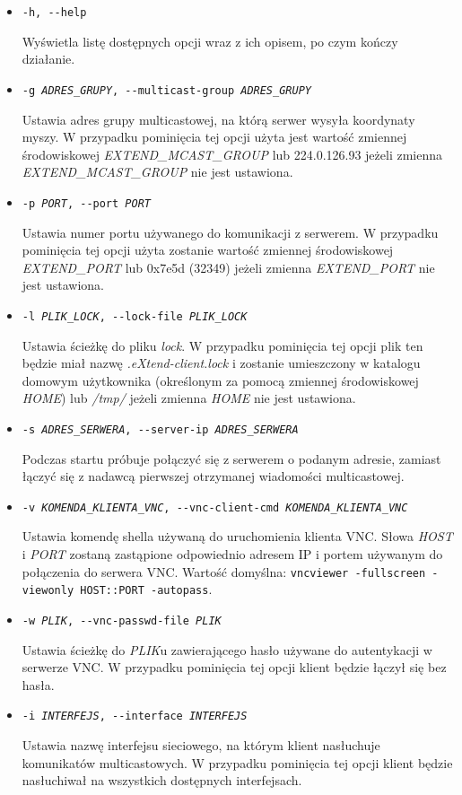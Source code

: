   \begin{itemize}
    \item \texttt{-h, -{}-help}

      Wyświetla listę dostępnych opcji wraz z ich opisem, po czym kończy działanie.

    \item \texttt{-g \emph{ADRES\_GRUPY}, -{}-multicast-group \emph{ADRES\_GRUPY}}

      Ustawia adres grupy multicastowej, na którą serwer wysyła koordynaty myszy. W przypadku pominięcia tej opcji użyta jest wartość zmiennej środowiskowej \emph{EXTEND\_MCAST\_GROUP} lub 224.0.126.93 jeżeli zmienna \emph{EXTEND\_MCAST\_GROUP} nie jest ustawiona.

    \item \texttt{-p \emph{PORT}, -{}-port \emph{PORT}}

      Ustawia numer portu używanego do komunikacji z serwerem. W przypadku pominięcia tej opcji użyta zostanie wartość zmiennej środowiskowej \emph{EXTEND\_PORT} lub 0x7e5d (32349) jeżeli zmienna \emph{EXTEND\_PORT} nie jest ustawiona.

    \item \texttt{-l \emph{PLIK\_LOCK}, -{}-lock-file \emph{PLIK\_LOCK}}

      Ustawia ścieżkę do pliku \emph{lock}. W przypadku pominięcia tej opcji plik ten będzie miał nazwę \emph{.eXtend-client.lock} i zostanie umieszczony w katalogu domowym użytkownika (określonym za pomocą zmiennej środowiskowej \emph{HOME}) lub \emph{/tmp/} jeżeli zmienna \emph{HOME} nie jest ustawiona.

    \item \texttt{-s \emph{ADRES\_SERWERA}, -{}-server-ip \emph{ADRES\_SERWERA}}

      Podczas startu próbuje połączyć się z serwerem o podanym adresie, zamiast łączyć się z nadawcą pierwszej otrzymanej wiadomości multicastowej.

    \item \texttt{-v \emph{KOMENDA\_KLIENTA\_VNC}, -{}-vnc-client-cmd \emph{KOMENDA\_KLIENTA\_VNC}}

       Ustawia komendę shella używaną do uruchomienia klienta VNC. Słowa \emph{HOST} i \emph{PORT} zostaną zastąpione odpowiednio adresem IP i portem używanym do połączenia do serwera VNC. Wartość domyślna: \texttt{vncviewer -fullscreen -viewonly HOST::PORT -autopass}.

    \item \texttt{-w \emph{PLIK}, -{}-vnc-passwd-file \emph{PLIK}}

      Ustawia ścieżkę do \emph{PLIK}u zawierającego hasło używane do autentykacji w serwerze VNC. W przypadku pominięcia tej opcji klient będzie łączył się bez hasła.

    \item \texttt{-i \emph{INTERFEJS}, -{}-interface \emph{INTERFEJS}}

      Ustawia nazwę interfejsu sieciowego, na którym klient nasłuchuje komunikatów multicastowych. W przypadku pominięcia tej opcji klient będzie nasłuchiwał na wszystkich dostępnych interfejsach.

  \end{itemize}

